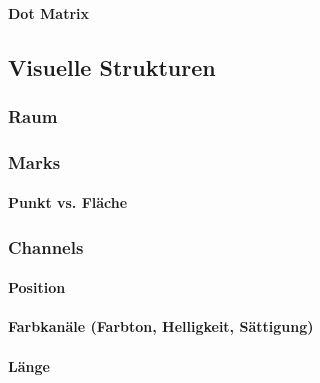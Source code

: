                 \paragraph{Dot Matrix} %

        \subsection{Visuelle Strukturen} %

            \subsubsection{Raum} %

            \subsubsection{Marks} %

                \paragraph{Punkt vs. Fläche} %

            \subsubsection{Channels} %

                \paragraph{Position} %

                \paragraph{Farbkanäle (Farbton, Helligkeit, Sättigung)} %

                \paragraph{Länge} %

